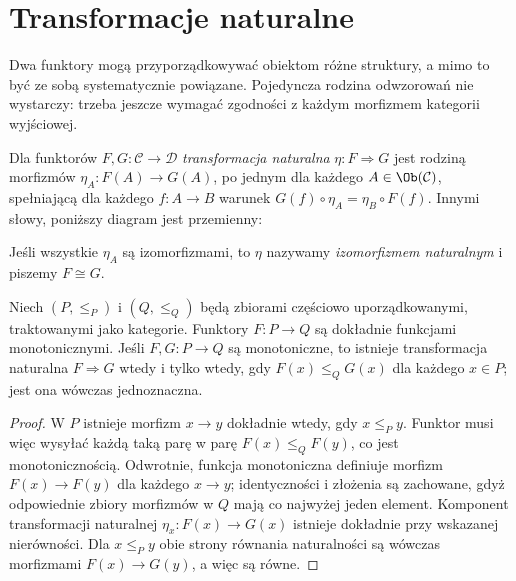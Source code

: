 \section{Transformacje naturalne}\label{sec:naturalne}

\providecommand{\atlasref}[2]{#2}

Dwa funktory mogą przyporządkowywać obiektom różne struktury, a mimo to być ze sobą systematycznie powiązane. Pojedyncza rodzina odwzorowań nie wystarczy: trzeba jeszcze wymagać zgodności z każdym morfizmem kategorii wyjściowej.

\begin{definicja}\label{def:naturalna}
Dla funktorów $F,G:\mathcal C\to\mathcal D$ \emph{transformacja naturalna} $\eta:F\Rightarrow G$ jest rodziną morfizmów $\eta_A:F(A)\to G(A)$, po jednym dla każdego $A\in\Ob(\mathcal C)$, spełniającą dla każdego $f:A\to B$ warunek $G(f)\circ\eta_A=\eta_B\circ F(f)$. Innymi słowy, poniższy diagram jest przemienny:
\begin{center}
\end{center}
Jeśli wszystkie $\eta_A$ są izomorfizmami, to $\eta$ nazywamy \emph{izomorfizmem naturalnym} i piszemy $F\cong G$.
\end{definicja}

\begin{stwierdzenie}\label{tw:fun-posety}
Niech $(P,\le_P)$ i $(Q,\le_Q)$ będą zbiorami częściowo uporządkowanymi, traktowanymi jako kategorie. Funktory $F:P\to Q$ są dokładnie funkcjami monotonicznymi. Jeśli $F,G:P\to Q$ są monotoniczne, to istnieje transformacja naturalna $F\Rightarrow G$ wtedy i tylko wtedy, gdy $F(x)\le_Q G(x)$ dla każdego $x\in P$; jest ona wówczas jednoznaczna.
\end{stwierdzenie}
\begin{proof}
W $P$ istnieje morfizm $x\to y$ dokładnie wtedy, gdy $x\le_P y$. Funktor musi więc wysyłać każdą taką parę w parę $F(x)\le_Q F(y)$, co jest monotonicznością. Odwrotnie, funkcja monotoniczna definiuje morfizm $F(x)\to F(y)$ dla każdego $x\to y$; identyczności i złożenia są zachowane, gdyż odpowiednie zbiory morfizmów w $Q$ mają co najwyżej jeden element. Komponent transformacji naturalnej $\eta_x:F(x)\to G(x)$ istnieje dokładnie przy wskazanej nierówności. Dla $x\le_P y$ obie strony równania naturalności są wówczas morfizmami $F(x)\to G(y)$, a więc są równe.
\end{proof}

